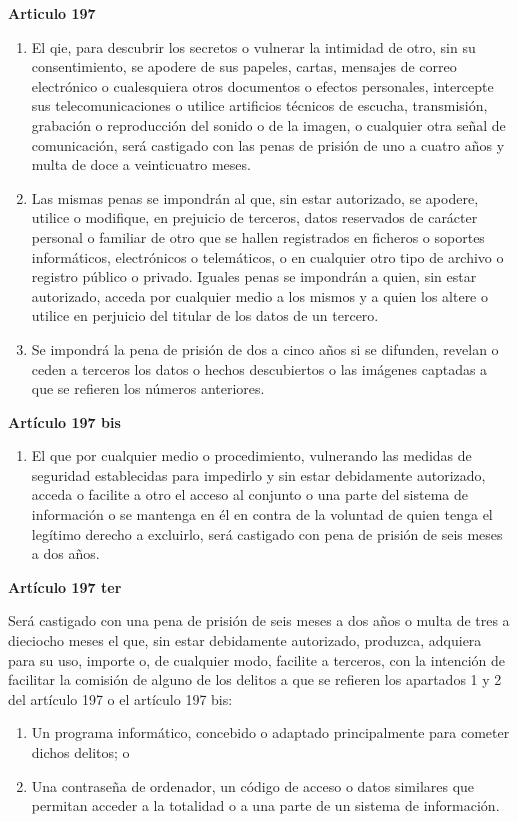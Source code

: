 \textbf{Articulo 197}
\begin{enumerate}[label=\textbf{\arabic*.}]
    \item El qie, para descubrir los secretos o vulnerar la intimidad de otro, sin su consentimiento, se apodere de sus papeles, cartas, mensajes de correo electrónico o cualesquiera otros documentos o efectos personales, intercepte sus telecomunicaciones o utilice artificios técnicos de escucha, transmisión, grabación o reproducción del sonido o de la imagen, o cualquier otra señal de comunicación, será castigado con las penas de prisión de uno a cuatro años y multa de doce a veinticuatro meses.
    \item Las mismas penas se impondrán al que, sin estar autorizado, se apodere, utilice o modifique, en prejuicio de terceros, datos reservados de carácter personal o familiar de otro que se hallen registrados en ficheros o soportes informáticos, electrónicos o telemáticos, o en cualquier otro tipo de archivo o registro público o privado. Iguales penas se impondrán a quien, sin estar autorizado, acceda por cualquier medio a los mismos y a quien los altere o utilice en perjuicio del titular de los datos de un tercero.
    \item Se impondrá la pena de prisión de dos a cinco años si se difunden, revelan o ceden a terceros los datos o hechos descubiertos o las imágenes captadas a que se refieren los números anteriores.
\end{enumerate}

\textbf{Artículo 197 bis}
\begin{enumerate}[label=\textbf{\arabic*.}]
    \item El que por cualquier medio o procedimiento, vulnerando las medidas de seguridad establecidas para impedirlo y sin estar debidamente autorizado, acceda o facilite a otro el acceso al conjunto o una parte del sistema de información o se mantenga en él en contra de la voluntad de quien tenga el legítimo derecho a excluirlo, será castigado con pena de prisión de seis meses a dos años.
\end{enumerate}

\textbf{Artículo 197 ter}

Será castigado con una pena de prisión de seis meses a dos años o multa de tres a dieciocho meses el que, sin estar debidamente autorizado, produzca, adquiera para su uso, importe o, de cualquier modo, facilite a terceros, con la intención de facilitar la comisión de alguno de los delitos a que se refieren los apartados 1 y 2 del artículo 197 o el artículo 197 bis:
\begin{enumerate}[label=\textbf{\alph*)}]
    \item Un programa informático, concebido o adaptado principalmente para cometer dichos delitos; o
    \item Una contraseña de ordenador, un código de acceso o datos similares que permitan acceder a la totalidad o a una parte de un sistema de información.
\end{enumerate}

